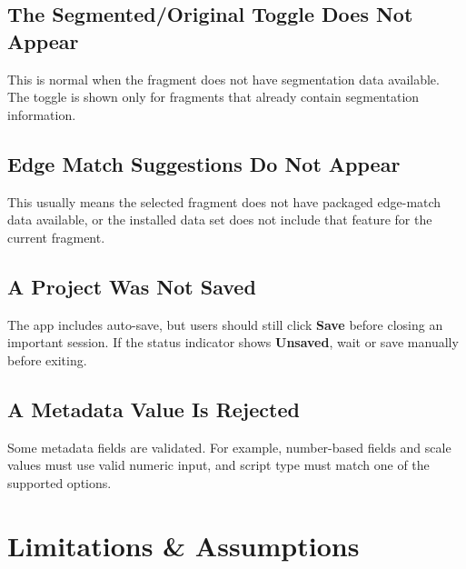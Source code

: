 \documentclass[12pt]{article}
\begin{document}
\subsection{The Segmented/Original Toggle Does Not Appear}
This is normal when the fragment does not have segmentation data available. The toggle is shown only for fragments that already contain segmentation information.

\subsection{Edge Match Suggestions Do Not Appear}
This usually means the selected fragment does not have packaged edge-match data available, or the installed data set does not include that feature for the current fragment.

\subsection{A Project Was Not Saved}
The app includes auto-save, but users should still click \textbf{Save} before closing an important session. If the status indicator shows \textbf{Unsaved}, wait or save manually before exiting.

\subsection{A Metadata Value Is Rejected}
Some metadata fields are validated. For example, number-based fields and scale values must use valid numeric input, and script type must match one of the supported options.

\section{Limitations \& Assumptions}
\end{document}
